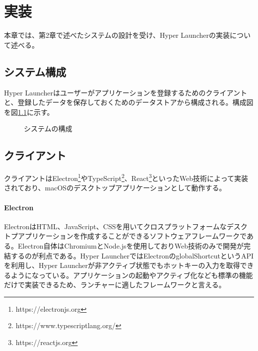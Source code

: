 \chapter{実装}
本章では、第2章で述べたシステムの設計を受け、Hyper Launcherの実装について述べる。

\newpage

\section{システム構成}
Hyper Launcherはユーザーがアプリケーションを登録するためのクライアントと、登録したデータを保存しておくためのデータストアから構成される。構成図を図\ref{fig:system}に示す。

\begin{figure}[h]
    \begin{center}
    \end{center}
    \caption{システムの構成}
    \label{fig:system}
\end{figure}

\section{クライアント}
クライアントはElectron\footnote{https://electronjs.org}やTypeScript\footnote{https://www.typescriptlang.org/}、React\footnote{https://reactjs.org}といったWeb技術によって実装されており、macOSのデスクトップアプリケーションとして動作する。

\subsubsection{Electron}
ElectronはHTML、JavaScript、CSSを用いてクロスプラットフォームなデスクトプアプリケーションを作成することができるソフトウェアフレームワークである。Electron自体はChromiumとNode.jsを使用しておりWeb技術のみで開発が完結するのが利点である。Hyper LauncherではElectronのglobalShortcutというAPIを利用し、Hyper Launcherが非アクティブ状態でもホットキーの入力を取得できるようになっている。アプリケーションの起動やアクティブ化なども標準の機能だけで実装できるため、ランチャーに適したフレームワークと言える。

